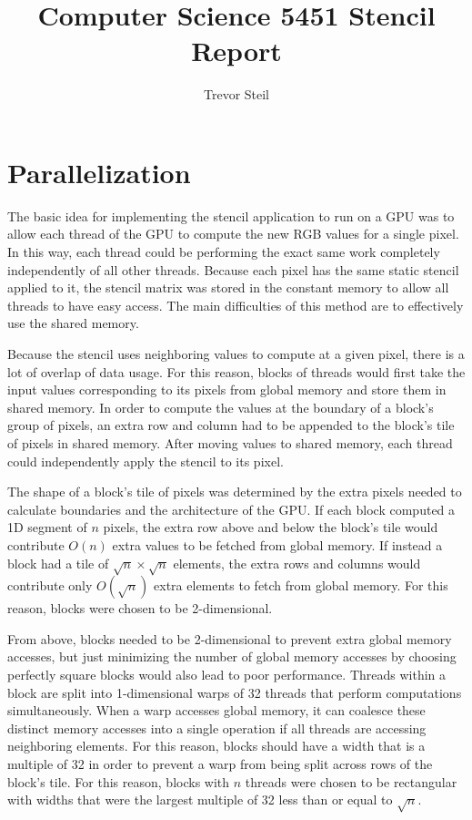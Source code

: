 \documentclass[a4paper]{article}
\title{Computer Science 5451 Stencil Report }
\date{}
\author{Trevor Steil}
\begin{document}
\maketitle

\section{Parallelization}

The basic idea for implementing the stencil application to run on a GPU was to allow each thread of the GPU to compute the new RGB values for a single
pixel. In this way, each thread could be performing the exact same work completely independently of all other threads. Because each pixel has the same
static stencil applied to it, the stencil matrix was stored in the constant memory to allow all threads to have easy access. The main difficulties of this
method are to effectively use the shared memory.

Because the stencil uses neighboring values to compute at a given pixel, there is a lot of overlap of data usage. For this reason, blocks of threads
would first take the input values corresponding to its pixels from global memory and store them in shared memory. In order to compute the values at
the boundary of a block's group of pixels, an extra row and column had to be appended to the block's tile of pixels in shared memory. After moving values to shared
memory, each thread could independently apply the stencil to its pixel.

The shape of a block's tile of pixels was determined by the extra pixels needed to calculate boundaries and the architecture of the GPU. If each block
computed a 1D segment of $n$ pixels, the extra row above and below the block's tile would contribute $O(n)$ extra values to be fetched from global
memory. If instead a block had a tile of $\sqrt{n} \times \sqrt{n}$ elements, the extra rows and columns would contribute only $O(\sqrt{n})$ extra
elements to fetch from global memory. For this reason, blocks were chosen to be 2-dimensional.

From above, blocks needed to be 2-dimensional to prevent extra global memory accesses, but just minimizing the number of global memory accesses by
choosing perfectly square blocks would also lead to poor performance. Threads within a block are split into 1-dimensional warps of 32 threads that perform
computations simultaneously. When a warp accesses global memory, it can coalesce these distinct memory accesses into a single operation if all threads
are accessing neighboring elements. For this reason, blocks should have a width that is a multiple of 32 in order to prevent a warp from being split
across rows of the block's tile. For this reason, blocks with $n$ threads were chosen to be rectangular with widths that were the largest multiple of 32 less than or
equal to $\sqrt{n}$.
\end{document}
